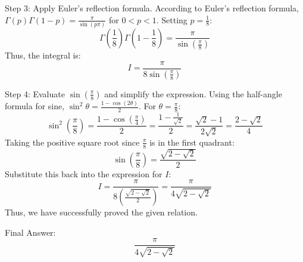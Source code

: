 \documentclass[11pt, a4paper]{article}
\begin{document}
Step 3: Apply Euler's reflection formula.
According to Euler's reflection formula, \(\Gamma(p)\Gamma(1-p) = \frac{\pi}{\sin(p\pi)}\) for \(0 < p < 1\).
Setting \(p = \frac{1}{8}\):
\[
\Gamma\left(\frac{1}{8}\right)\Gamma\left(1 - \frac{1}{8}\right) = \frac{\pi}{\sin\left(\frac{\pi}{8}\right)}
\]
Thus, the integral is:
\[
I = \frac{\pi}{8 \sin\left(\frac{\pi}{8}\right)}
\]

Step 4: Evaluate \(\sin\left(\frac{\pi}{8}\right)\) and simplify the expression.
Using the half-angle formula for sine, \(\sin^2\theta = \frac{1 - \cos(2\theta)}{2}\).
For \(\theta = \frac{\pi}{8}\):
\[
\sin^2\left(\frac{\pi}{8}\right) = \frac{1 - \cos\left(\frac{\pi}{4}\right)}{2} = \frac{1 - \frac{1}{\sqrt{2}}}{2} = \frac{\sqrt{2} - 1}{2\sqrt{2}} = \frac{2 - \sqrt{2}}{4}
\]
Taking the positive square root since \(\frac{\pi}{8}\) is in the first quadrant:
\[
\sin\left(\frac{\pi}{8}\right) = \frac{\sqrt{2 - \sqrt{2}}}{2}
\]
Substitute this back into the expression for \(I\):
\[
I = \frac{\pi}{8 \left(\frac{\sqrt{2 - \sqrt{2}}}{2}\right)} = \frac{\pi}{4\sqrt{2 - \sqrt{2}}}
\]
Thus, we have successfully proved the given relation.

Final Answer:
\[
\boxed{\frac{\pi}{4\sqrt{2-\sqrt{2}}}}
\]
\end{document}
